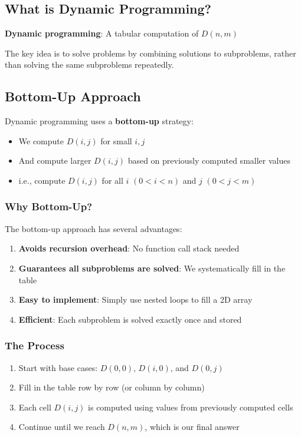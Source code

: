 \documentclass[11pt,a4paper]{article}
\theoremstyle{definition}
\theoremstyle{plain}
\theoremstyle{remark}
\begin{document}
\subsection{What is Dynamic Programming?}

\textbf{Dynamic programming}: A tabular computation of $D(n,m)$

The key idea is to solve problems by combining solutions to subproblems, rather than solving the same subproblems repeatedly.

\subsection{Bottom-Up Approach}

Dynamic programming uses a \textbf{bottom-up} strategy:

\begin{itemize}
    \item We compute $D(i,j)$ for small $i,j$
    \item And compute larger $D(i,j)$ based on previously computed smaller values
    \item i.e., compute $D(i,j)$ for all $i$ $(0 < i < n)$ and $j$ $(0 < j < m)$
\end{itemize}

\subsubsection{Why Bottom-Up?}

The bottom-up approach has several advantages:

\begin{enumerate}
    \item \textbf{Avoids recursion overhead}: No function call stack needed
    \item \textbf{Guarantees all subproblems are solved}: We systematically fill in the table
    \item \textbf{Easy to implement}: Simply use nested loops to fill a 2D array
    \item \textbf{Efficient}: Each subproblem is solved exactly once and stored
\end{enumerate}

\subsubsection{The Process}

\begin{enumerate}
    \item Start with base cases: $D(0,0)$, $D(i,0)$, and $D(0,j)$
    \item Fill in the table row by row (or column by column)
    \item Each cell $D(i,j)$ is computed using values from previously computed cells
    \item Continue until we reach $D(n,m)$, which is our final answer
\end{enumerate}
\end{document}

